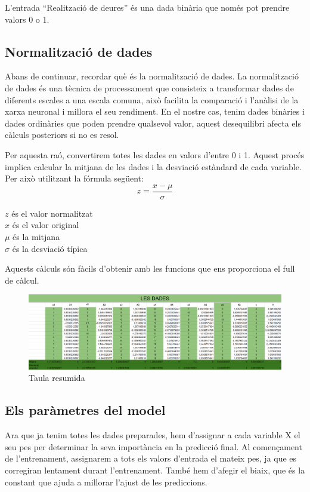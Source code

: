 L'entrada ``Realització de deures'' és una dada binària que només pot prendre valors 0 o 1.
\subsection{Normalització de dades}\label{subsec:24}
Abans de continuar, recordar què és la normalització de dades.
La normalització de dades és una tècnica de processament que consisteix a transformar dades de diferents escales a una escala comuna, això facilita la comparació i l'anàlisi de la xarxa neuronal i millora el seu rendiment. En el nostre cas, tenim dades binàries i dades ordinàries que poden prendre qualsevol valor, aquest desequilibri afecta els càlculs posteriors si no es resol.

Per aquesta raó, convertirem totes les dades en valors d'entre 0 i 1. Aquest procés implica calcular la mitjana de les dades i la desviació estàndard de cada variable. Per això utilitzant la fórmula següent:
$$z = \frac{x - \mu}{\sigma}$$
\begin{center}
    $z$ és el valor normalitzat\\
    $x$ és el valor original\\
    $\mu$ és la mitjana\\
    $\sigma$ és la desviació típica
\end{center}


Aquests càlculs són fàcils d'obtenir amb les funcions que ens proporciona el full de càlcul.

\begin{figure}[H]
    \centering
    \includegraphics[width=1\textwidth]{./figures/Dades_normalitzades.png}
    \caption{Taula resumida}
\end{figure}

\subsection{Els paràmetres del model}
Ara que ja tenim totes les dades preparades, hem d'assignar a cada variable X el seu pes per determinar la seva importància en la predicció final. Al començament de l'entrenament, assignarem a tots els valors d'entrada el mateix pes, ja que es corregiran lentament durant l'entrenament.
També hem d'afegir el biaix, que és la constant que ajuda a millorar l'ajust de les prediccions.

